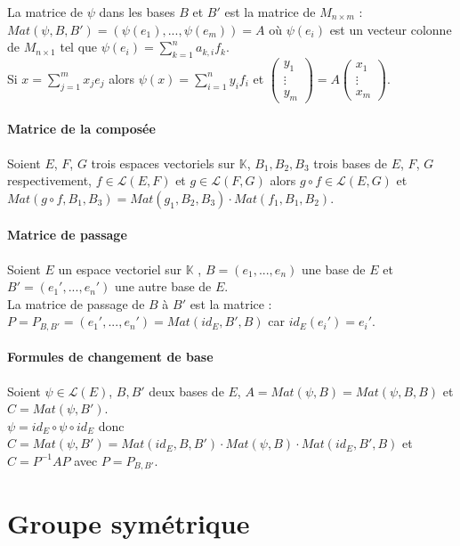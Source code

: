 \documentclass[a4paper,10pt]{book} %
\newcommand{\K}{\mathbb{K}}
\newcommand{\evs}{espaces vectoriels }
\newcommand{\ev}{espace vectoriel }
\begin{document}
La matrice de $\psi$ dans les bases $B$ et $B'$ est la matrice de $M_{n\times m}$ : $Mat(\psi,B,B')=(\psi(e_1),...,\psi(e_m))=A$ où $\psi(e_i)$ est un vecteur colonne de $M_{n\times 1}$ tel que $\psi(e_i)=\sum_{k=1}^na_{k,i}f_k$.\\

Si $x=\sum_{j=1}^m x_je_j$ alors $\psi(x)=\sum_{i=1}^n y_if_i$ et $\begin{pmatrix}
y_1\\\vdots\\y_m
\end{pmatrix}=A\begin{pmatrix}
x_1\\\vdots\\x_m
\end{pmatrix}$.

\subsubsection{Matrice de la composée}
Soient $E$, $F$, $G$ trois \evs sur $\K$, $B_1,B_2,B_3$ trois bases de $E$, $F$, $G$ respectivement, $f \in \mathcal{L}(E,F)$ et $g\in \mathcal{L}(F,G)$ alors $g\circ f\in \mathcal{L}(E,G)$ et \\$Mat(g\circ f, B_1,B_3)=Mat(g_1,B_2,B_3)\cdot Mat(f_1,B_1,B_2)$.

\subsubsection{Matrice de passage}
Soient $E$ un \ev sur $\K$ , $B=(e_1,...,e_n)$ une base de $E$ et $B'=(e_1',...,e_n')$ une autre base de $E$.\\

La matrice de passage de $B$ à $B'$ est la matrice : $P=P_{B,B'}=(e_1',...,e_n')=Mat(id_E,B',B)$ car $id_E(e_i')=e_i'$.

\subsubsection{Formules de changement de base}
Soient $\psi\in \mathcal{L}(E)$, $B,B'$ deux bases de $E$, $A=Mat(\psi,B)=Mat(\psi,B,B)$ et $C=Mat(\psi,B')$.\\

$\psi=id_E\circ \psi\circ id_E$ donc $C=Mat(\psi,B')=Mat(id_E,B,B')\cdot Mat(\psi,B)\cdot Mat(id_E,B',B)$ et $C=P^{-1}AP$ avec $P=P_{B,B'}$.



\chapter{Groupe symétrique}
\end{document}
